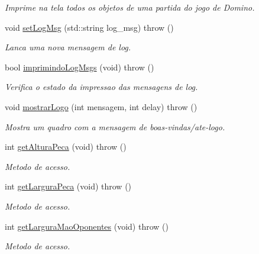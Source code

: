 \begin{DoxyCompactItemize}
\begin{DoxyCompactList}\small\item\em Imprime na tela todos os objetos de uma partida do jogo de Domino. \item\end{DoxyCompactList}\item 
void \hyperlink{classEngine_a1311380efe1b58d05823df25493ad94a}{setLogMsg} (std::string log\_\-msg)  throw ()
\begin{DoxyCompactList}\small\item\em Lanca uma nova mensagem de log. \item\end{DoxyCompactList}\item 
bool \hyperlink{classEngine_aff02f15a2f3bf697dadfc6f6246ffb20}{imprimindoLogMsgs} (void)  throw ()
\begin{DoxyCompactList}\small\item\em Verifica o estado da impressao das mensagens de log. \item\end{DoxyCompactList}\item 
void \hyperlink{classEngine_ad1942265a77a1e2fd8eaaac042d6428f}{mostrarLogo} (int mensagem, int delay)  throw ()
\begin{DoxyCompactList}\small\item\em Mostra um quadro com a mensagem de boas-\/vindas/ate-\/logo. \item\end{DoxyCompactList}\item 
int \hyperlink{classEngine_ac571cfb9db59c34ee344033d481d951d}{getAlturaPeca} (void)  throw ()
\begin{DoxyCompactList}\small\item\em Metodo de acesso. \item\end{DoxyCompactList}\item 
int \hyperlink{classEngine_a42ff065d53469219cb2fb71672b6d157}{getLarguraPeca} (void)  throw ()
\begin{DoxyCompactList}\small\item\em Metodo de acesso. \item\end{DoxyCompactList}\item 
int \hyperlink{classEngine_ad2cb6693d7f8615399a9b6a1384b7fb7}{getLarguraMaoOponentes} (void)  throw ()
\begin{DoxyCompactList}\small\item\em Metodo de acesso. \item\end{DoxyCompactList}\item 

\end{DoxyCompactItemize}
